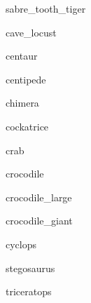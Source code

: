 \documentclass[letterpaper,serif]{module}
\begin{document}
\begin{newmonster}{sabre_tooth_tiger}\end{newmonster}

\begin{newmonster}{cave_locust}\end{newmonster}

\begin{newmonster}{centaur}\end{newmonster}

\begin{newmonster}{centipede}\end{newmonster}

\begin{newmonster}{chimera}\end{newmonster}

\begin{newmonster}{cockatrice}\end{newmonster}

\begin{newmonster}{crab}\end{newmonster}


\begin{newmonster}{crocodile}\end{newmonster}

\begin{newmonster}{crocodile_large}\end{newmonster}

\begin{newmonster}{crocodile_giant}\end{newmonster}

\begin{newmonster}{cyclops}\end{newmonster}


\begin{newmonster}{stegosaurus}\end{newmonster}

\begin{newmonster}{triceratops}\end{newmonster}
\end{document}
